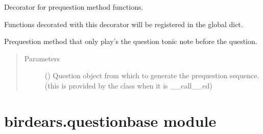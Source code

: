 \documentclass[letterpaper,10pt,english]{sphinxmanual}
\begin{document}

\begin{fulllineitems}
\label{\detokenize{birdears:birdears.prequestion.register_prequestion_method}}
\sphinxAtStartPar
Decorator for prequestion method functions.

\sphinxAtStartPar
Functions decorated with this decorator will be registered in the
 global dict.

\end{fulllineitems}


\begin{fulllineitems}
\label{\detokenize{birdears:birdears.prequestion.tonic_only}}
\sphinxAtStartPar
Pre\sphinxhyphen{}question method that only play’s the question tonic note before the
question.
\begin{quote}\begin{description}
\item[{Parameters}] \leavevmode
\sphinxAtStartPar
{} () \textendash{} Question object from which to generate the
pre\sphinxhyphen{}question sequence. (this is provided by the  class
when it is {\color{red}\bfseries{}\textasciigrave{}}\_\_call\_\_\textasciigrave{}ed)

\end{description}\end{quote}

\end{fulllineitems}



\section{birdears.questionbase module}
\label{\detokenize{birdears:module-birdears.questionbase}}\label{\detokenize{birdears:birdears-questionbase-module}}
\end{document}
